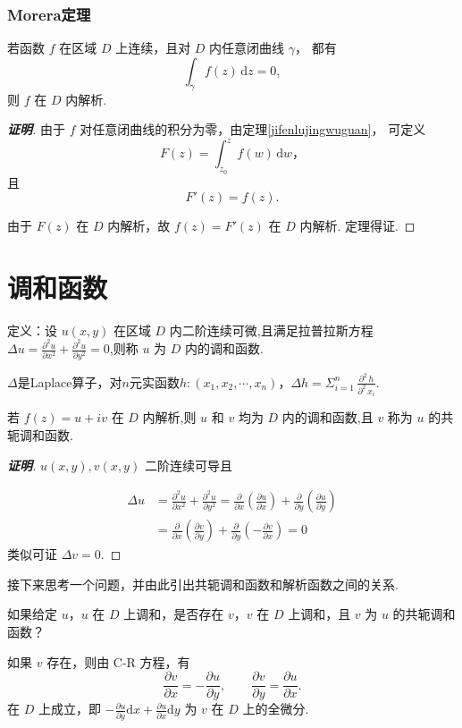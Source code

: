 \documentclass[openany,oneside]{ctexbook}
\begin{document}
\subsubsection{Morera定理}
\begin{theorem}
  若函数 $f$ 在区域 $D$ 上连续，且对 $D$ 内任意闭曲线 $\gamma$，
都有
\[
\int_{\gamma} f(z)\,\mathrm{d}z = 0,
\]
则 $f$ 在 $D$ 内解析.
\end{theorem}
\begin{proof}[\textbf{证明}]
由于 $f$ 对任意闭曲线的积分为零，由定理\ref{jifenlujingwuguan}，
可定义
\[
F(z)=\int_{z_0}^{z} f(w)\,\mathrm{d}w，
\]且
\[
F'(z)=f(z).
\]

由于 $F(z)$ 在 $D$ 内解析，故 $f(z)=F'(z)$ 在 $D$ 内解析.
定理得证.
\end{proof}
\section{调和函数}

\begin{definition}
  定义：设 $u(x,y)$ 在区域 $D$ 内二阶连续可微,且满足拉普拉斯方程 $\Delta u = \frac{\partial^2 u}{\partial x^2} + \frac{\partial^2 u}{\partial y^2} = 0$,则称 $u$ 为 $D$ 内的调和函数.

\end{definition}
\begin{note}
  $\Delta$是Laplace算子，对$n$元实函数$h:(x_1,x_2,\cdots,x_n)$，$\Delta h=\Sigma^n_{i=1}\,\frac{\partial^2\,h}{\partial^2\,x_i}$.
\end{note}
\begin{theorem}
若 $f(z) = u + iv$ 在 $D$ 内解析,则 $u$ 和 $v$ 均为 $D$ 内的调和函数,且 $v$ 称为 $u$ 的共轭调和函数.
\end{theorem}
\begin{proof}[\textbf{证明}]
  \( u(x,y),v(x,y) \) 二阶连续可导且

\[
\begin{aligned}
\Delta u &= \frac{\partial^2 u}{\partial x^2} + \frac{\partial^2 u}{\partial y^2} = \frac{\partial}{\partial x}\left(\frac{\partial u}{\partial x}\right) + \frac{\partial}{\partial y}\left(\frac{\partial u}{\partial y}\right) \\
&= \frac{\partial}{\partial x}\left(\frac{\partial v}{\partial y}\right) + \frac{\partial}{\partial y}\left(-\frac{\partial v}{\partial x}\right) = 0
\end{aligned}
\]
类似可证 \(\Delta v = 0\).
\end{proof}
接下来思考一个问题，并由此引出共轭调和函数和解析函数之间的关系.
\begin{problem}如果给定 \( u \)，\( u \) 在 \( D \) 上调和，是否存在 \( v \)，\( v \) 在 \( D \) 上调和，且
\( v \) 为 \( u \) 的共轭调和函数？
\end{problem}
如果 \( v \) 存在，则由 C-R 方程，有
\[
\frac{\partial v}{\partial x} = -\frac{\partial u}{\partial y},\qquad
\frac{\partial v}{\partial y} = \frac{\partial u}{\partial x}.
\]
在 \( D \) 上成立，即 \( -\frac{\partial u}{\partial y}\mathrm{d}x + \frac{\partial u}{\partial x}\mathrm{d}y \) 为 \( v \) 在 \( D \) 上的全微分.
\end{document}
